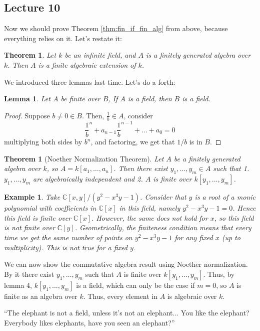 \documentclass[12pt]{article}
\newcommand{\C}{\mathbb{C}}
\newtheorem*{example}{Example}
\newtheorem{theorem}{Theorem}[section]
\newtheorem*{theorem*}{Theorem}
\newtheorem{lemma}{Lemma}[section]
\begin{document}
    \subsection{Lecture 10}
    Now we should prove Theorem \ref{thm:fin_if_fin_alg} from above, because everything relies on it. Let's restate it: 
    \begin{theorem*}
        Let $k$ be an infinite field, and $A$ is a finitely generated algebra over $k$. Then $A$ is a finite algebraic extension of $k$. 
    \end{theorem*}
    We introduced three lemmas last time. Let's do a forth:
    \begin{lemma}
        Let $A$ be finite over $B$, If $A$ is a field, then $B$ is a field. 
    \end{lemma}
    \begin{proof}
        Suppose $b \neq 0 \in B$. Then, $\frac{1}{b} \in A$, consider 
        $$\frac{1}{b}^n + a_{n-1}\frac{1}{b}^{n-1} + \dots + a_0 = 0$$
        multiplying both sides by $b^n$, and factoring, we get that $1/b$ is in $B$. 
    \end{proof}
    \begin{theorem}
        [Noether Normalization Theorem] Let $A$ be a finitely generated algebra over $k$, so $A = k[a_1, \dots, a_n]$. Then there exist $y_1, \dots, y_m \in A$ such that 1. $y_1, \dots, y_m$ are algebraically independent and 2. $A$ is finite over $k[y_1, \dots, y_m]$. 
    \end{theorem}
    \begin{example}
        Take $\C[x, y]/(y^2 - x^3y - 1)$. Consider that $y$ is a root of a monic polynomial with coefficients in $\C[x]$ in this field, namely $y^2 - x^3y - 1 = 0$. Hence this field is finite over $\C[x]$. However, the same does not hold for $x$, so this field is not finite over $\C[y]$. Geometrically, the finiteness condition means that every time we get the same number of points on $y^2 - x^3y - 1$ for any fixed $x$ (up to multiplicity). This is not true for a fixed $y$. 
    \end{example}
    We can now show the commutative algebra result using Noether normalization. By it there exist $y_1, \dots, y_m$ such that $A$ is finite over $k[y_1, \dots, y_m]$. Thus, by lemma 4, $k[y_1, \dots, y_m]$ is a field, which can only be the case if $m = 0$, so $A$ is finite as an algebra over $k$. Thus, every element in $A$ is algebraic over $k$. \par 
    ``The elephant is not a field, unless it's not an elephant... You like the elephant? Everybody likes elephants, have you seen an elephant?'' \par 
\end{document}

